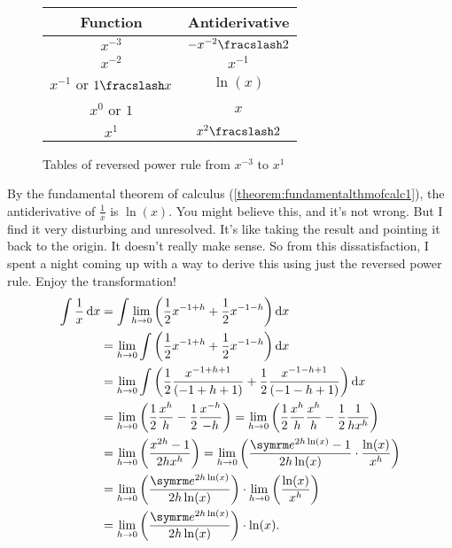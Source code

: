 \begin{wrapfigure}{r}{0.45\textwidth}
    \centering
    \begin{tabular}{c | c}
        Function & Antiderivative \\
        \hline
        $x^{-3}$ & $-\flatfrac{x^{-2}}{2}$ \\
        $x^{-2}$ & $x^{-1}$ \\
        $x^{-1}$ or $\flatfrac{1}{x}$ & $\ln(x)$ \\
        $x^{0}$ or $1$ & $x$ \\
        $x^1$ & $\flatfrac{x^2}{2}$ \\
    \end{tabular}
    \caption{Tables of reversed power rule from $x^{-3}$ to $x^1$}
\end{wrapfigure}
By the fundamental theorem of calculus (\cref{theorem:fundamentalthmofcalc1}), the antiderivative of $\frac{1}{x}$ is $\ln(x)$. You might believe this, and it's not wrong. But I find it very disturbing and unresolved. It's like taking the result and pointing it back to the origin. It doesn't really make sense. So from this dissatisfaction, I spent a night coming up with a way to derive this using just the reversed power rule. Enjoy the transformation!
\begin{align}
	\int \frac{1}{x}\odif{x} &= \int\lim_{h \appr 0}\left(\frac{1}{2}x^{-1 + h} + \frac{1}{2}x^{-1 - h}\right)\odif{x} \nonumber\\
							 &= \lim_{h \appr 0}\int\left(\frac{1}{2}x^{-1 + h} + \frac{1}{2}x^{-1 - h}\right)\odif{x} \nonumber\\
							 &= \lim_{h \appr 0}\int\left(\frac{1}{2}\frac{x^{-1 + h + 1}}{(-1 + h + 1)} + \frac{1}{2}\frac{x^{-1 - h + 1}}{(-1 - h + 1)}\right)\odif{x} \nonumber\\
    &= \lim_{h \appr 0}\left(\frac{1}{2}\frac{x^h}{h} - \frac{1}{2}\frac{x^{-h}}{-h}\right) = \lim_{h \appr 0}\left(\frac{1}{2}\frac{x^h}{h}\frac{x^h}{h} - \frac{1}{2}\frac{1}{hx^h}\right) \nonumber\\
    &= \lim_{h \appr 0}\left(\frac{x^{2h} - 1}{2hx^h}\right) = \lim_{h \appr 0}\left(\frac{\e^{2h\ln(x)} - 1}{2h\ln(x)}\cdot\frac{\ln(x)}{x^h}\right) \nonumber\\
    &= \lim_{h \appr 0}\left(\frac{\e^{2h\ln(x)}}{2h\ln(x)}\right) \cdot \lim_{h \appr 0}\left(\frac{\ln(x)}{x^h}\right) \nonumber\\
    &= \lim_{h \appr 0}\left(\frac{\e^{2h\ln(x)}}{2h\ln(x)}\right) \cdot \ln(x). \label{eq:logarithmsprove1}
\end{align}
